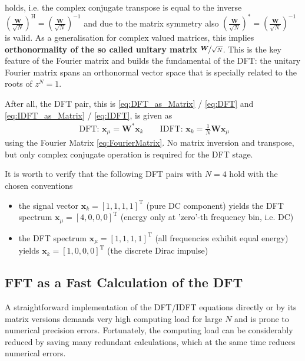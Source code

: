 \documentclass[11pt,a4paper,DIV=12]{scrartcl}
\begin{document}
holds, i.e. the complex conjugate transpose is equal to the inverse
$\left(\frac{\mathbf{W}}{\sqrt{N}}\right)^\mathrm{H} =
\left(\frac{\mathbf{W}}{\sqrt{N}} \right)^{-1}$
and due to the matrix symmetry also
$\left(\frac{\mathbf{W}}{\sqrt{N}}\right)^* =
\left(\frac{\mathbf{W}}{\sqrt{N}} \right)^{-1}$
is valid.
%
As a generalisation for complex valued matrices, this implies \textbf{orthonormality
of the so called unitary matrix} $\nicefrac{\bm W}{\sqrt{N}}$.
%
This is the key feature of the Fourier matrix and builds the fundamental of the
DFT:
%
the unitary Fourier matrix spans an orthonormal vector space that is specially
related to the roots of $z^N=1$.
%
\begin{framed}
After all, the DFT pair, this is
\eqref{eq:DFT_as_Matrix} / \eqref{eq:DFT} and
\eqref{eq:IDFT_as_Matrix} / \eqref{eq:IDFT},
is given as
\begin{align}
\text{ DFT: }\bm{x}_\mu = \bm{W}^* \bm{x}_k\qquad
\text{IDFT: }\bm{x}_k = \frac{1}{N} \bm{W} \bm{x}_\mu
\end{align}
using the Fourier Matrix \eqref{eq:FourierMatrix}.
No matrix inversion and transpose, but only complex conjugate operation is
required for the DFT stage.
\end{framed}
%
It is worth to verify that the following DFT pairs with $N=4$ hold with the
chosen conventions
\begin{itemize}
  \item the signal vector $\mathbf{x}_k=[1,1,1,1]^\mathrm{T}$ (pure DC component)
  yields the DFT spectrum $\mathbf{x}_\mu = [4,0,0,0]^\mathrm{T}$
  (energy only at 'zero'-th frequency bin, i.e. DC)
  \item the DFT spectrum $\mathbf{x}_\mu = [1,1,1,1]^\mathrm{T}$
  (all frequencies exhibit equal energy) yields $\mathbf{x}_k = [1,0,0,0]^\mathrm{T}$
  (the discrete Dirac impulse)
\end{itemize}

\subsection{FFT as a Fast Calculation of the DFT}
%
A straightforward implementation of the DFT/IDFT equations directly or
by its matrix versions demands very high computing load for large $N$ and
is prone to numerical precision errors.
%
Fortunately, the computing load can be considerably reduced by saving many
redundant calculations, which at the same time reduces numerical errors.
%
\end{document}
